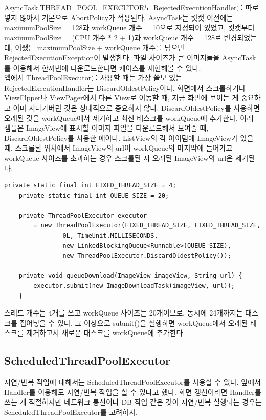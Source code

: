 AsyncTask.THREAD\_POOL\_EXECUTOR도 RejectedExecutionHandler를 따로 넣지 않아서 기본으로 AbortPolicy가 적용된다. 
AsyncTask는 킷캣 이전에는 maximumPoolSize = 128과 workQueue 개수 = 10으로 지정되어 있었고, 킷캣부터 maximumPoolSize = (CPU 개수 * 2 + 1)과 workQueue 개수 = 128로 변경되었는데, 어쨌든 maximumPoolSize + workQueue 개수를 넘으면 RejectedExecutionException이 발생한다. 
파일 사이즈가 큰 이미지들을 AsyncTask를 이용해서 한꺼번에 다운로드한다면 케이스를 재현해볼 수 있다.\\

앱에서 ThreadPoolExecutor를 사용할 때는 가장 쓸모 있는 RejectedExecutionHandler는 DiscardOldestPolicy이다. 
화면에서 스크롤하거나 ViewFlpper나 ViewPager에서 다른 View로 이동할 때, 지금 화면에 보이는 게 중요하고 이미 지나가버린 것은 상대적으로 중요하지 않다. 
DiscardOldestPolicy를 사용하면 오래된 것을 workQueue에서 제거하고 최신 태스크를 workQueue에 추가한다. 
아래 샘플은 ImageView에 표시할 이미지 파일을 다운로드해서 보여줄 때, DiscardOldestPolicy를 사용한 예이다.
ListView의 각 아이템에 ImageView가 있을 때, 스크롤된 위치에서 ImageView의 url이 workQueue의 마지막에 들어가고 workQueue 사이즈를 초과하는 경우 스크롤된 지 오래된 ImageView의 url은 제거된다.
\begin{lstlisting}[frame=single] 
	private static final int FIXED_THREAD_SIZE = 4;
	private static final int QUEUE_SIZE = 20;
	
	private ThreadPoolExecutor executor
		= new ThreadPoolExecutor(FIXED_THREAD_SIZE, FIXED_THREAD_SIZE, 
				0L, TimeUnit.MILLISECONDS, 
				new LinkedBlockingQueue<Runnable>(QUEUE_SIZE), 
				new ThreadPoolExecutor.DiscardOldestPolicy());
	
	private void queueDownload(ImageView imageView, String url) {
		executor.submit(new ImageDownloadTask(imageView, url));
	}
\end{lstlisting}
스레드 개수는 4개를 쓰고 workQueue 사이즈는 20개이므로, 동시에 24개까지는 태스크를 집어넣을 수 있다. 그 이상으로 submit()을 실행하면 workQueue에서 오래된 태스크를 제거하고서 새로운 태스크를 workQueue에 추가한다.
	
\subsection{ScheduledThreadPoolExecutor}
지연/반복 작업에 대해서는 ScheduledThreadPoolExecutor를 사용할 수 있다.
앞에서 Handler를 이용해도 지연/반복 작업을 할 수 있다고 했다.
화면 갱신이라면 Handler를 쓰는 게 적절하지만 네트워크 통신이나 DB 작업 같은 것이 지연/반복 실행되는 경우는 ScheduledThreadPoolExecutor를 고려하자.\\

